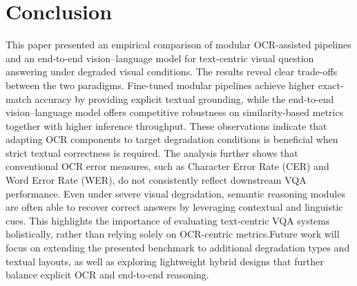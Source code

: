 \documentclass[conference]{IEEEtran}
\begin{document}
\section{Conclusion}

This paper presented an empirical comparison of modular OCR-assisted pipelines and an end-to-end vision--language model for text-centric visual question answering under degraded visual conditions. The results reveal clear trade-offs between the two paradigms. Fine-tuned modular pipelines achieve higher exact-match accuracy by providing explicit textual grounding, while the end-to-end vision--language model offers competitive robustness on similarity-based metrics together with higher inference throughput. These observations indicate that adapting OCR components to target degradation conditions is beneficial when strict textual correctness is required. The analysis further shows that conventional OCR error measures, such as Character Error Rate (CER) and Word Error Rate (WER), do not consistently reflect downstream VQA performance. Even under severe visual degradation, semantic reasoning modules are often able to recover correct answers by leveraging contextual and linguistic cues. This highlights the importance of evaluating text-centric VQA systems holistically, rather than relying solely on OCR-centric metrics.Future work will focus on extending the presented benchmark to additional degradation types and textual layouts, as well as exploring lightweight hybrid designs that further balance explicit OCR and end-to-end reasoning. 


\end{document}
